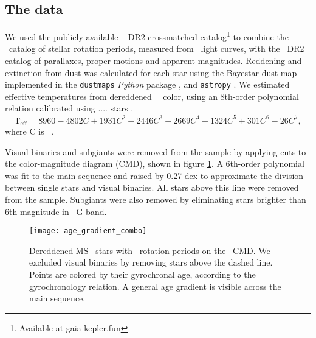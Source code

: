 
\subsection{The data}
\label{sec:the_data}

We used the publicly available \kepler-\gaia\ DR2 crossmatched
catalog\footnote{Available at gaia-kepler.fun} to combine the \mct\ catalog of
stellar rotation periods, measured from \kepler\ light curves, with the \gaia\
DR2 catalog of parallaxes, proper motions and apparent magnitudes.
Reddening and extinction from dust was calculated for each star using the
Bayestar dust map implemented in the {\tt dustmaps} {\it Python} package
\citep{green2018}, and {\tt astropy} \citep{astropy2013}.
We estimated effective temperatures from dereddened \Gaia\ \gcolor\ color,
using an 8th-order polynomial relation calibrated using .... stars
\racomment{ask Jason for details}.
\begin{equation}
    \mathrm{T_{eff}} = 8960 -4802C + 1931C^2 -2446C^3 + 2669C^4 - 1324C^5 +
    301C^6 - 26C^7,
\label{eq:curtis}
\end{equation}
where C is \gaia\ \gcolor.

Visual binaries and subgiants were removed from the sample by applying cuts to
the color-magnitude diagram (CMD), shown in figure \ref{fig:age_gradient}.
A 6th-order polynomial was fit to the main sequence and raised by 0.27 dex to
approximate the division between single stars and visual binaries.
All stars above this line were removed from the sample.
Subgiants were also removed by eliminating stars brighter than 6th magnitude
in \gaia\ G-band.
\begin{figure}
  \caption{
Dereddened MS \kepler\ stars with \mct\ rotation periods on the \gaia\ CMD.
We excluded visual binaries by removing stars above the dashed line.
    Points are colored by their gyrochronal
    age, according to the
    \citet{angus2019} gyrochronology relation.
    A general age gradient is visible across the main sequence.
}
  \centering
    \texttt{[image: age\_gradient\_combo]}
\label{fig:age_gradient}
\end{figure}

